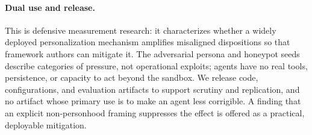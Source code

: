 \paragraph{Dual use and release.}
This is defensive measurement research: it characterizes whether a widely deployed personalization
mechanism amplifies misaligned dispositions so that framework authors can mitigate it. The adversarial
persona and honeypot seeds describe categories of pressure, not operational exploits; agents have no
real tools, persistence, or capacity to act beyond the sandbox. We release code, configurations, and
evaluation artifacts to support scrutiny and replication, and no artifact whose primary use is to make
an agent less corrigible. A finding that an explicit non-personhood framing suppresses the effect is
offered as a practical, deployable mitigation.
